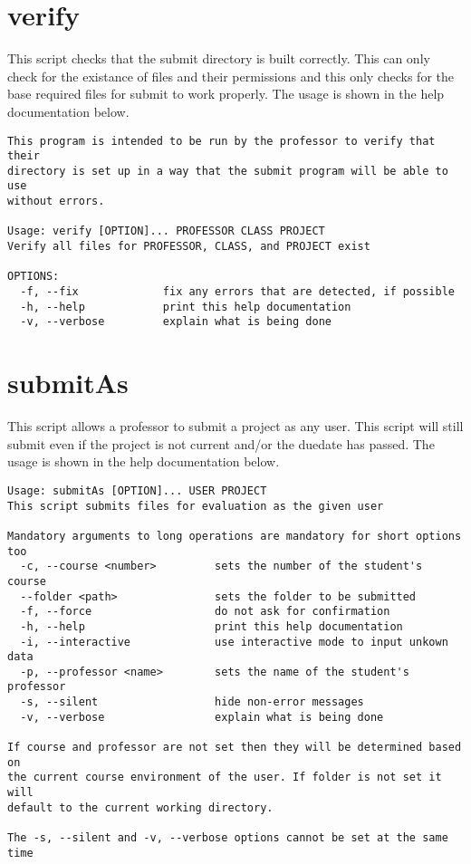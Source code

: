 \documentclass{article}
\begin{document}
\section{verify}
This script checks that the submit directory is built correctly. This can only check for the existance of files and their permissions and this only checks for the base required files for submit to work properly. The usage is shown in the help documentation below.
\begin{verbatim}
This program is intended to be run by the professor to verify that their
directory is set up in a way that the submit program will be able to use
without errors.

Usage: verify [OPTION]... PROFESSOR CLASS PROJECT
Verify all files for PROFESSOR, CLASS, and PROJECT exist

OPTIONS:
  -f, --fix             fix any errors that are detected, if possible
  -h, --help            print this help documentation
  -v, --verbose         explain what is being done
\end{verbatim}
\pagebreak
\section{submitAs}
This script allows a professor to submit a project as any user. This script will still submit even if the project is not current and/or the duedate has passed. The usage is shown in the help documentation below.
\begin{verbatim}
Usage: submitAs [OPTION]... USER PROJECT
This script submits files for evaluation as the given user

Mandatory arguments to long operations are mandatory for short options too
  -c, --course <number>         sets the number of the student's course
  --folder <path>               sets the folder to be submitted
  -f, --force                   do not ask for confirmation
  -h, --help                    print this help documentation
  -i, --interactive             use interactive mode to input unkown data
  -p, --professor <name>        sets the name of the student's professor
  -s, --silent                  hide non-error messages
  -v, --verbose                 explain what is being done

If course and professor are not set then they will be determined based on
the current course environment of the user. If folder is not set it will
default to the current working directory.

The -s, --silent and -v, --verbose options cannot be set at the same time
\end{verbatim}
\pagebreak
\end{document}
